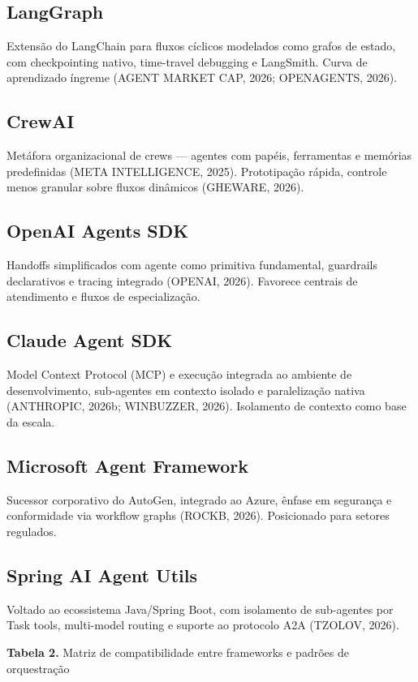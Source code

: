 \documentclass[12pt,a4paper]{article}
\begin{document}
\subsection{LangGraph}
Extensão do LangChain para fluxos cíclicos modelados como grafos de estado, com checkpointing nativo, time-travel debugging e LangSmith. Curva de aprendizado íngreme (AGENT MARKET CAP, 2026; OPENAGENTS, 2026).

\subsection{CrewAI}
Metáfora organizacional de crews — agentes com papéis, ferramentas e memórias predefinidas (META INTELLIGENCE, 2025). Prototipação rápida, controle menos granular sobre fluxos dinâmicos (GHEWARE, 2026).

\subsection{OpenAI Agents SDK}
Handoffs simplificados com agente como primitiva fundamental, guardrails declarativos e tracing integrado (OPENAI, 2026). Favorece centrais de atendimento e fluxos de especialização.

\subsection{Claude Agent SDK}
Model Context Protocol (MCP) e execução integrada ao ambiente de desenvolvimento, sub-agentes em contexto isolado e paralelização nativa (ANTHROPIC, 2026b; WINBUZZER, 2026). Isolamento de contexto como base da escala.

\subsection{Microsoft Agent Framework}
Sucessor corporativo do AutoGen, integrado ao Azure, ênfase em segurança e conformidade via workflow graphs (ROCKB, 2026). Posicionado para setores regulados.

\subsection{Spring AI Agent Utils}
Voltado ao ecossistema Java/Spring Boot, com isolamento de sub-agentes por Task tools, multi-model routing e suporte ao protocolo A2A (TZOLOV, 2026).

\textbf{Tabela 2.} Matriz de compatibilidade entre frameworks e padrões de orquestração
\end{document}
